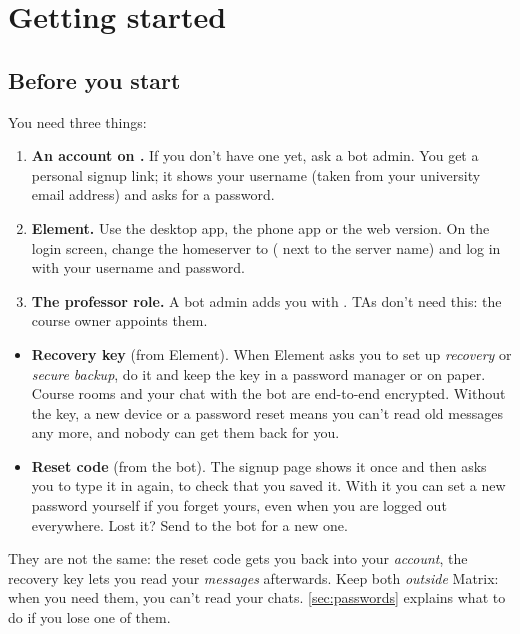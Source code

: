 \chapter{Getting started}
\label{ch:start}

\section{Before you start}

You need three things:

\begin{enumerate}
  \item \textbf{An account on \server.} If you don't have one yet, ask a bot admin. You get a
        personal signup link; it shows your username (taken from your university email
        address) and asks for a password.
  \item \textbf{Element.} Use the desktop app, the phone app or the web version. On the login
        screen, change the homeserver to \server{} ( next to the server name) and
        log in with your username and password.
  \item \textbf{The professor role.} A bot admin adds you with . TAs
        don't need this: the course owner appoints them.
\end{enumerate}

\begin{warning}
\begin{itemize}
  \item \textbf{Recovery key} (from Element). When Element asks you to set up
        \emph{recovery} or \emph{secure backup}, do it and keep the key in a password
        manager or on paper. Course rooms and your chat with the bot are end-to-end
        encrypted. Without the key, a new device or a password reset means you can't read
        old messages any more, and nobody can get them back for you.
  \item \textbf{Reset code} (from the bot). The signup page shows it once and then asks you
        to type it in again, to check that you saved it. With it you can set a new password
        yourself if you forget yours, even when you are logged out everywhere. Lost it? Send
         to the bot for a new one.
\end{itemize}
They are not the same: the reset code gets you back into your \emph{account}, the recovery
key lets you read your \emph{messages} afterwards.
Keep both \emph{outside} Matrix: when you need them, you can't read your chats.
\autoref{sec:passwords} explains what to do if you lose one of them.
\end{warning}

